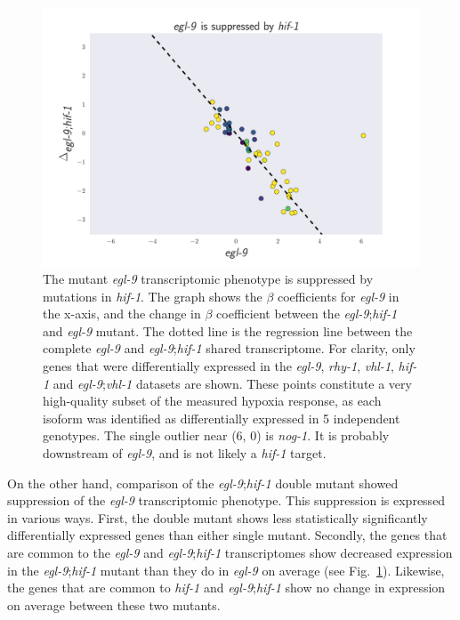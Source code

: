 \documentclass[9pt,twocolumn,twoside]{pnas-new}
\newcommand{\egl}{\emph{egl-9}}
\newcommand{\nog}{\emph{nog-1}}
\newcommand{\rhy}{\emph{rhy-1}}
\newcommand{\vhl}{\emph{vhl-1}}
\newcommand{\hif}{\emph{hif-1}}
\begin{document}
\begin{figure}[tbhp]
\centering
\includegraphics[width=\linewidth]{figs/egl9_epistatic_eglhif.pdf}
\caption{
The mutant \egl{} transcriptomic phenotype is suppressed by mutations in \hif{}.
The graph shows the $\beta$ coefficients for \egl{} in the x-axis, and the change
in $\beta$ coefficient between the \egl;\hif{} and \egl{} mutant. The dotted
line is the regression line between the complete \egl{} and \egl{};\hif{} shared
transcriptome. For clarity, only genes that were differentially expressed in the
\egl{}, \rhy{}, \vhl{}, \hif{} and \egl;\vhl{} datasets are shown. These points
constitute a very high-quality subset of the measured hypoxia response, as each
isoform was identified as differentially expressed in 5 independent genotypes.
The single outlier near (6, 0) is \nog{}. It is probably downstream of
\egl{}, and is not likely a \hif{} target.
}
\label{fig:egl9epistasis}
\end{figure}

On the other hand, comparison of the \egl{};\hif{} double mutant showed
suppression of the \egl{} transcriptomic phenotype. This suppression is expressed
in various ways. First, the double mutant shows less statistically significantly
differentially expressed genes than either single mutant. Secondly, the genes
that are common to the \egl{} and \egl{};\hif{} transcriptomes show decreased
expression in the \egl{};\hif{} mutant than they do in \egl{} on average (see
Fig.~\ref{fig:egl9epistasis}). Likewise, the genes that are common to \hif{}
and \egl{};\hif{} show no change in expression on average between these two mutants.
\end{document}

